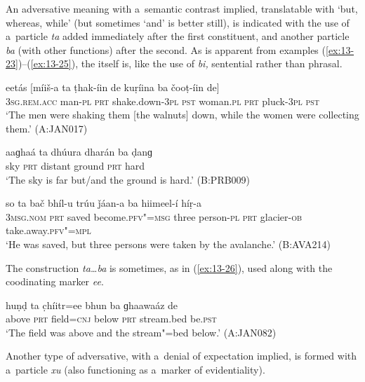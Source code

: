  An adversative meaning with a~semantic contrast implied, translatable with `but, whereas, while' (but sometimes `and' is better still), is indicated with the use of a~particle \textit{ta} added immediately after the first constituent, and another particle \textit{ba} (with other  functions) after the second. As is apparent from examples (\ref{ex:13-23})--(\ref{ex:13-25}), the  itself is, like the use of \textit{bi,} sentential rather than phrasal.

\begin{exe}
\ex
\label{ex:13-23}
\gll eetás [míiš-a ta ṭhak-íin de kuṛíina ba čooṭ-íin de] \\
\textsc{3sg.rem.acc} man-\textsc{pl} \textsc{prt} shake.down-\textsc{3pl} \textsc{pst} woman.\textsc{pl} \textsc{prt} pluck-\textsc{3pl} \textsc{pst} \\
\glt `The men were shaking them [the walnuts] down, while the women were collecting them.' (A:JAN017)

\ex
\label{ex:13-24}
\gll aaɡhaá ta dhúura dharán ba ḍanɡ  \\
sky \textsc{prt} distant ground \textsc{prt} hard \\
\glt `The sky is far but/and the ground is hard.' (B:PRB009)

\ex
\label{ex:13-25}
\gll so ta bač bhíl-u trúu ǰáan-a ba hiimeel-í híṛ-a \\
\textsc{3msg.nom} \textsc{prt} saved become.\textsc{pfv"=msg} three person-\textsc{pl} \textsc{prt } glacier-\textsc{ob} take.away.\textsc{pfv"=mpl}  \\
\glt `He was saved, but three persons were taken by the avalanche.' (B:AVA214) 
\end{exe}

The construction \textit{ta{\ldots}ba} is sometimes, as in (\ref{ex:13-26}), used along with the coodinating marker \textit{ee}.

\begin{exe}
\ex
\label{ex:13-26}
\gll huṇḍ ta c̣híitr=ee bhun ba ɡhaawaáz de \\
above \textsc{prt} field=\textsc{cnj} below \textsc{prt} stream.bed be.\textsc{pst} \\
\glt `The field was above and the stream"=bed below.' (A:JAN082) 
\end{exe}


 Another type of adversative, with a~denial of expectation implied, is formed with a~particle \textit{xu} (also functioning as a~marker of evidentiality).

